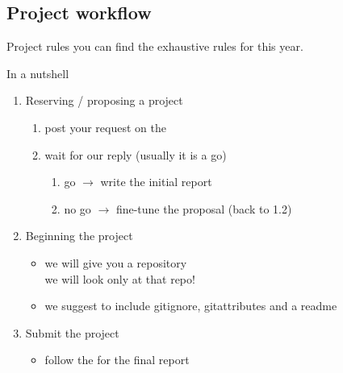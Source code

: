 \documentclass[presentation]{beamer}\mode<presentation>{\usetheme{AMSBolognaFC}}
\begin{document}
\subsection{Project workflow}

\begin{frame}[c]{Project rules}
     you can find the exhaustive rules for this year.
    
    \begin{block}{In a nutshell}
    \begin{enumerate}
        \item Reserving / proposing a project
        \begin{enumerate}
            \item post your request on the 
            \item\label{item:wait} wait for our reply (usually it is a go)
            \begin{enumerate}
                \item go $\rightarrow$ write the initial report
                \item no go $\rightarrow$ fine-tune the proposal (back to 1.2)
            \end{enumerate}
        \end{enumerate}
        \item Beginning the project
        \begin{itemize}
            \item we will give you a repository
            \\
            \alert{we will look only at that repo!}
            \item we suggest to include \alert{gitignore}, \alert{gitattributes} and a readme
        \end{itemize}
        \item Submit the project
        \begin{itemize}
            \item follow the  for the final report
        \end{itemize}
    \end{enumerate}
    \end{block}
\end{frame}
\end{document}
